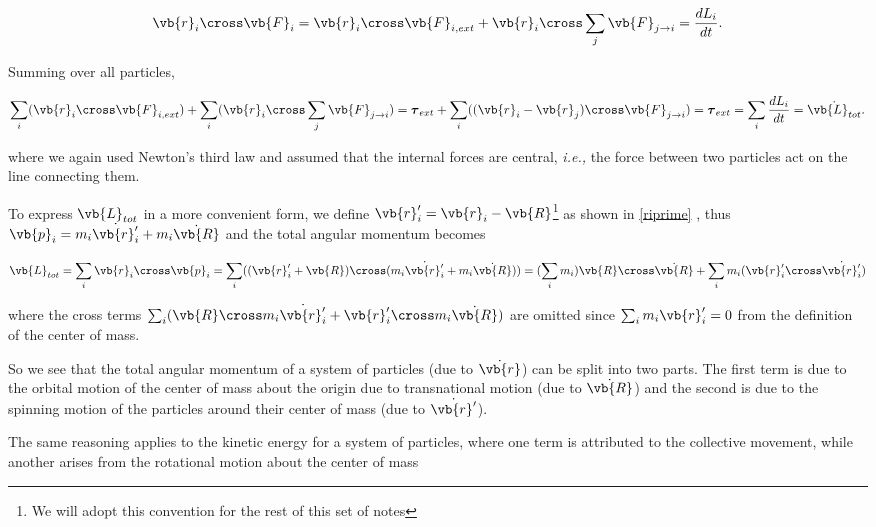 \documentclass[a4paper,12pt]{report}
\begin{document}
\begin{equation}
	 \vb{r }_{i}  \cross \vb{F} _{i} = \vb{r} _{i} \cross \vb{F} _{i, ext} + \vb{r} _{i} \cross \sum_{j}^{} \vb{F} _{j \rightarrow i} = \frac{dL_{i} }{dt}. 
\end{equation}

Summing over all particles, 

\begin{equation}
	\sum_{i}^{} (\vb{r} _{i} \cross \vb{F} _{i,ext}) + \sum_{i}^{} (\vb{r} _{i} \cross \sum_{j}^{} \vb{F} _{j \rightarrow i}) = \boldsymbol{\tau }_{ext}  + \sum_{i}^{} ((\vb{r} _{i} - \vb{r} _{j} ) \cross  \vb{F} _{j \rightarrow  i } ) = \boldsymbol{\tau } _{ext} = \sum_{i}^{} \frac{dL_{i} }{dt}  = \dot{\vb{L}_{tot}}. 
\end{equation}

where we again used Newton's third law and assumed that the internal forces are central, \textit{i.e.,} the force between two particles act on the line connecting them.

To express \(\vb{L} _{tot} \) in a more convenient form, we define \(\vb{r}'_{i} = \vb{r} _{i} - \vb{R}  \)\footnote{We will adopt this convention for the rest of this set of notes}  as shown in \cref{riprime}  , thus \(\vb{p} _{i} = m_{i}\dot{\vb{r} '_{i} }  + m_{i} \dot{\vb{R} }  \) and the total angular momentum becomes 

\begin{equation}
	\vb{L} _{tot} = \sum_{i}^{} \vb{r} _{i} \cross \vb{p} _{i} = \sum_{i}^{}  ((\vb{r} '_{i} + \vb{R} ) \cross (m_{i}\dot{\vb{r} '_{i} }  + m_{i} \dot{\vb{R} } )) = (\sum_{i}^{} m_{i}) \vb{R} \cross \dot{\vb{R} } + \sum_{i}^{} m_{i} (\vb{r} '_{i} \cross \dot{\vb{r} '_{i} } )  \label{L1}   
\end{equation}

where the cross terms \(\sum_{i}^{} (\vb{R} \cross m_{i} \dot{\vb{r} '_{i} }  + \vb{r} '_{i} \cross m_{i}  \dot{\vb{R} } ) \) are omitted since \(\sum_{i}^{} m_{i} \vb{r} '_{i} = 0 \) from the definition of the center of mass.

So we see that the total angular momentum of a system of particles (due to \(\dot{\vb{r} } \))  can be split into two parts. The first term is due to the orbital motion of the center of mass about the origin due to transnational motion (due to \(\dot{\vb{R} } \))  and the second is due to the spinning motion of the particles around their center of mass (due to \(\dot{\vb{r} '} \)).

The same reasoning applies to the kinetic energy for a system of particles, where one term is attributed to the collective movement, while another arises from the rotational motion about the center of mass
\end{document}

